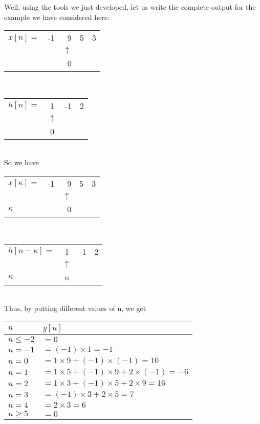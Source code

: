 Well, using the tools we just developed, let us write the complete output for the example we have considered here:\\
\begin{tabular}{ l  c r r r }
  $x[n] =$ & -1 & 9 & 5 & 3 \\
   &  & $\uparrow$ &  & \\
   &  & 0 &  & \\
\end{tabular}\\
\begin{tabular}{ l  c r r  }
  $h[n] =$ & 1 & -1 & 2\\
     & $\uparrow$ &  & \\
     & 0 &  & \\
\end{tabular}\\
So we have\\
\begin{tabular}{ l  c r r r }
  $x[\kappa] =$ & -1 & 9 & 5 & 3 \\
   &  & $\uparrow$ &  & \\
  $\kappa$ &  & 0 &  & \\
\end{tabular}\\
\begin{tabular}{ l  c r r  }
  $h[n-\kappa] =$ & 1 & -1 & 2\\
     & $\uparrow$ &  & \\
   $\kappa$  & n &  & \\
\end{tabular}\\
Thus, by putting different values of n, we get\\
\begin{tabular}{| l | l |}
\hline
$n$ & $y[n]$\\ \hline
$n \le -2$ & $=0$\\
$n = -1$ & $=(-1)\times 1=-1$\\
$n = 0$ & $=1\times 9+(-1)\times (-1)=10$\\
$n = 1$ & $=1\times 5+(-1)\times 9+2\times (-1)=-6$\\
$n = 2$ & $=1\times 3+(-1)\times 5+2\times 9=16$\\
$n = 3$ & $=(-1)\times 3+2\times 5=7$\\
$n = 4$ & $=2\times 3=6$\\
$n \ge 5$ & $=0$\\ \hline
\end{tabular}\\
